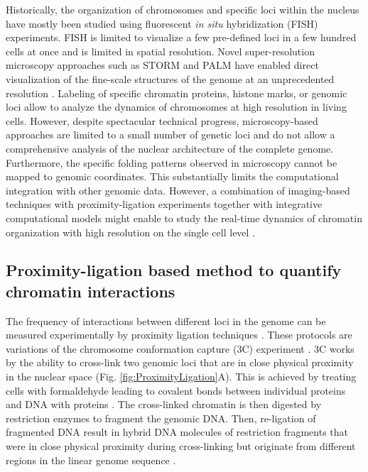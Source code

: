 \documentclass[a4paper,twoside=true,openright,parskip=full,chapterprefix=true,11pt,headings=normal,bibliography=totoc,listof=totoc,titlepage=on,captions=tableabove,draft=false]{scrreprt}
\theoremstyle{definition}
\theoremstyle{definition}
\theoremstyle{definition}
\theoremstyle{remark}
\begin{document}
Historically, the organization of chromosomes and specific loci within
the nucleus have mostly been studied using fluorescent \emph{in situ}
hybridization (FISH) experiments. FISH is limited to visualize a few
pre-defined loci in a few hundred cells at once and is limited in
spatial resolution. Novel super-resolution microscopy approaches such as
STORM and PALM have enabled direct visualization of the fine-scale
structures of the genome at an unprecedented resolution
\citep{Bonev2016}. Labeling of specific chromatin proteins, histone
marks, or genomic loci allow to analyze the dynamics of chromosomes at
high resolution in living cells. However, despite spectacular technical
progress, microscopy-based approaches are limited to a small number of
genetic loci and do not allow a comprehensive analysis of the nuclear
architecture of the complete genome. Furthermore, the specific folding
patterns observed in microscopy cannot be mapped to genomic coordinates.
This substantially limits the computational integration with other
genomic data. However, a combination of imaging-based techniques with
proximity-ligation experiments together with integrative computational
models might enable to study the real-time dynamics of chromatin
organization with high resolution on the single cell level
\citep{Stevens2017, Flyamer2017}.

\hypertarget{proximity-ligation}{%
\subsection{Proximity-ligation based method to quantify chromatin
interactions}\label{proximity-ligation}}

The frequency of interactions between different loci in the genome can
be measured experimentally by proximity ligation techniques
\citep{Sati2017, Schmitt2016}. These protocols are variations of the
chromosome conformation capture (3C) experiment \citep{Dekker2002}. 3C
works by the ability to cross-link two genomic loci that are in close
physical proximity in the nuclear space (Fig.
\ref{fig:ProximityLigation}A). This is achieved by treating cells with
formaldehyde leading to covalent bonds between individual proteins and
DNA with proteins \citep{Hoffman2015}. The cross-linked chromatin is
then digested by restriction enzymes to fragment the genomic DNA. Then,
re-ligation of fragmented DNA result in hybrid DNA molecules of
restriction fragments that were in close physical proximity during
cross-linking but originate from different regions in the linear genome
sequence \citep{Dekker2013, Andrey2017}.
\end{document}
